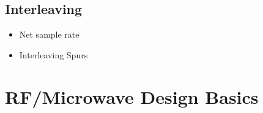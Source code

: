 \cite{walt}
\subsection{Interleaving}

\begin{itemize}
\item Net sample rate
\item Interleaving Spurs
\end{itemize}

\cite{mangrob}




\newpage
\section{RF/Microwave Design Basics}